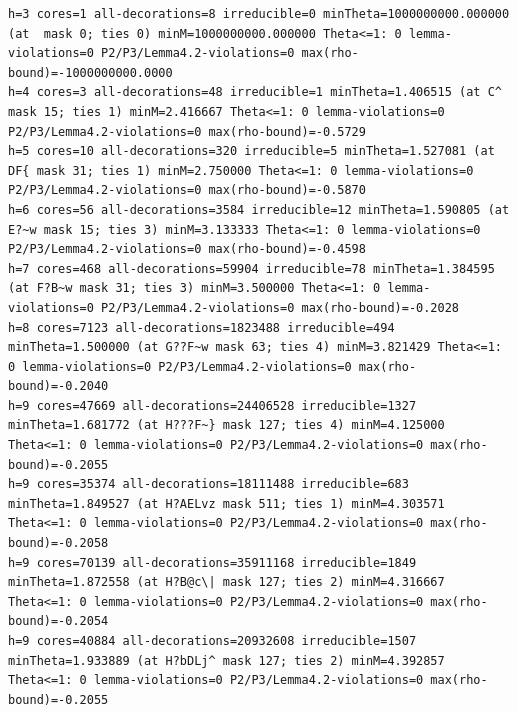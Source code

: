 \documentclass[11pt,a4paper]{article}
\theoremstyle{definition}
\theoremstyle{remark}
\numberwithin{equation}{section}
\begin{document}
\begin{lstlisting}
h=3 cores=1 all-decorations=8 irreducible=0 minTheta=1000000000.000000 (at  mask 0; ties 0) minM=1000000000.000000 Theta<=1: 0 lemma-violations=0 P2/P3/Lemma4.2-violations=0 max(rho-bound)=-1000000000.0000
h=4 cores=3 all-decorations=48 irreducible=1 minTheta=1.406515 (at C^ mask 15; ties 1) minM=2.416667 Theta<=1: 0 lemma-violations=0 P2/P3/Lemma4.2-violations=0 max(rho-bound)=-0.5729
h=5 cores=10 all-decorations=320 irreducible=5 minTheta=1.527081 (at DF{ mask 31; ties 1) minM=2.750000 Theta<=1: 0 lemma-violations=0 P2/P3/Lemma4.2-violations=0 max(rho-bound)=-0.5870
h=6 cores=56 all-decorations=3584 irreducible=12 minTheta=1.590805 (at E?~w mask 15; ties 3) minM=3.133333 Theta<=1: 0 lemma-violations=0 P2/P3/Lemma4.2-violations=0 max(rho-bound)=-0.4598
h=7 cores=468 all-decorations=59904 irreducible=78 minTheta=1.384595 (at F?B~w mask 31; ties 3) minM=3.500000 Theta<=1: 0 lemma-violations=0 P2/P3/Lemma4.2-violations=0 max(rho-bound)=-0.2028
h=8 cores=7123 all-decorations=1823488 irreducible=494 minTheta=1.500000 (at G??F~w mask 63; ties 4) minM=3.821429 Theta<=1: 0 lemma-violations=0 P2/P3/Lemma4.2-violations=0 max(rho-bound)=-0.2040
h=9 cores=47669 all-decorations=24406528 irreducible=1327 minTheta=1.681772 (at H???F~} mask 127; ties 4) minM=4.125000 Theta<=1: 0 lemma-violations=0 P2/P3/Lemma4.2-violations=0 max(rho-bound)=-0.2055
h=9 cores=35374 all-decorations=18111488 irreducible=683 minTheta=1.849527 (at H?AELvz mask 511; ties 1) minM=4.303571 Theta<=1: 0 lemma-violations=0 P2/P3/Lemma4.2-violations=0 max(rho-bound)=-0.2058
h=9 cores=70139 all-decorations=35911168 irreducible=1849 minTheta=1.872558 (at H?B@c\| mask 127; ties 2) minM=4.316667 Theta<=1: 0 lemma-violations=0 P2/P3/Lemma4.2-violations=0 max(rho-bound)=-0.2054
h=9 cores=40884 all-decorations=20932608 irreducible=1507 minTheta=1.933889 (at H?bDLj^ mask 127; ties 2) minM=4.392857 Theta<=1: 0 lemma-violations=0 P2/P3/Lemma4.2-violations=0 max(rho-bound)=-0.2055
\end{lstlisting}
\end{document}
